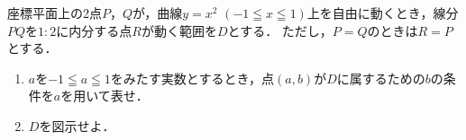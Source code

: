 \documentclass[../../main.tex]{subfiles}
\begin{document}
座標平面上の2点$P$，$Q$が，曲線$y=x^2$ $(-1 \leqq x \leqq 1)$上を自由に動くとき，線分$PQ$を$1:2$に内分する点$R$が動く範囲を$D$とする．
ただし，$P=Q$のときは$R=P$とする．
\begin{enumerate}
  \item $a$を$-1 \leqq a \leqq 1$をみたす実数とするとき，点$(a,b)$が$D$に属するための$b$の条件を$a$を用いて表せ．
  \item $D$を図示せよ．
\end{enumerate}
\end{document}

